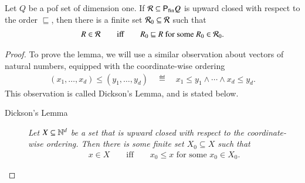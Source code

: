 \begin{lemma}\label{lem:finitely-generated-upward-closed}
    Let $Q$ be a pof set of dimension one. If  ${\mathcal R} \subseteq {\mathsf P}_{\text{fin}} Q$ is upward closed with respect to the order $\sqsubseteq$, then there is a finite set ${\mathcal R}_0 \subseteq {\mathcal R}$ such that
    \begin{align*}
    R \in {\mathcal R}
    \qquad \text{iff} \qquad 
    R_0  \sqsubseteq R \text{ for some $R_0 \in {\mathcal R}_0$}.
    \end{align*}
\end{lemma}
\begin{proof}
    To prove the lemma, we will use a similar observation about vectors of natural numbers, equipped with the  coordinate-wise ordering
    \begin{align*}
    (x_1,\ldots,x_d) \leq (y_1,\ldots,y_d) 
    \quad \eqdef \quad x_1 \leq y_1 \land \cdots \land x_d \leq y_d.
    \end{align*}
    This observation is called Dickson's Lemma, and is stated below.

    \begin{description}
        \item[Dickson's Lemma]  \emph{        Let $X \subseteq {\mathbb N}^d$ be a set that is upward closed with respect to the coordinate-wise ordering. Then there is some finite set $X_0 \subseteq X$ such that 
        \begin{align*}
        x \in X \qquad \text{iff} \qquad x_0 \le x \text{ for some $x_0 \in X_0$}.
        \end{align*}}
    \end{description}


\end{proof}
